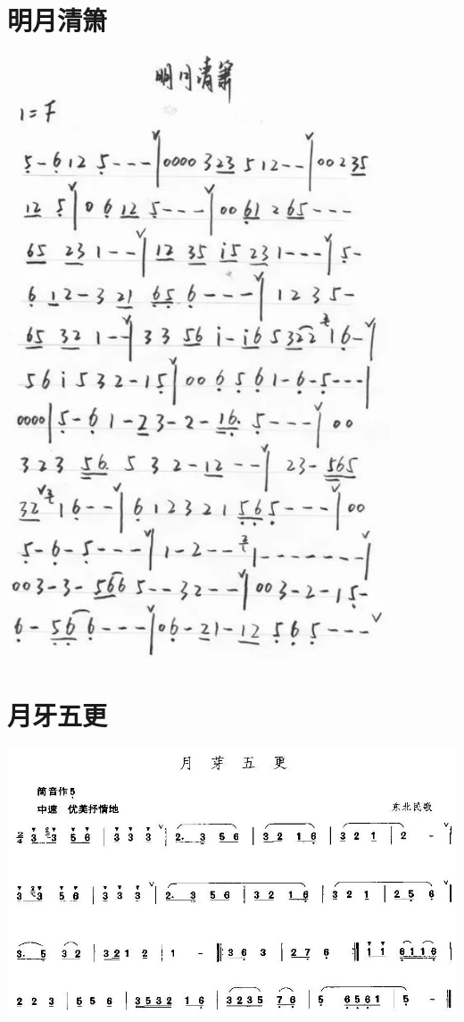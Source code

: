 \documentclass[cn,pad,chinesefont=nofont,twocol]{elegantbook}
\begin{document}
\section{明月清箫}\includegraphics[width=0.85\textwidth]{dongxiao/20200819/明月清箫.png}
\section{月牙五更}\includegraphics[width=\textwidth]{dongxiao/20200819/月牙五更.jpeg}
\end{document}
